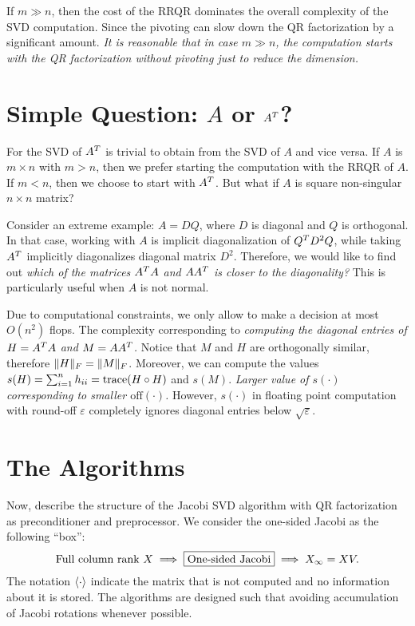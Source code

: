 \documentclass{article}
\begin{document}
\begin{remark}
  If $m \gg n$, then the cost of the RRQR dominates the overall complexity
  of the SVD computation. Since the pivoting can slow down the QR
  factorization by a significant amount. \emph{It is reasonable that in
    case $m\gg n$, the computation starts with the QR factorization without
  pivoting just to reduce the dimension.}
\end{remark}

\section{Simple Question: $A$ or $A^{T}$?}
For the SVD of $A^{T}$ is trivial to obtain from the SVD of $A$ and vice
versa. If $A$ is $m\times n$ with $m > n$, then we prefer starting the
computation with the RRQR of $A$. If $m < n$, then we choose to start with
$A^{T}$. But what if $A$ is square non-singular $n\times n$ matrix? 

Consider an extreme example: $A = DQ$, where $D$ is diagonal and $Q$ is
orthogonal. In that case, working with $A$ is implicit diagonalization of
$Q^{T} D^2Q$, while taking $A^{T}$ implicitly diagonalizes diagonal matrix
$D^2$. Therefore, we would like to find out \emph{which of the matrices
  $A^{T} A$ and $AA^{T}$ is closer to the diagonality?} This is particularly
useful when $A$ is not normal.

Due to computational constraints, we only allow to make a decision at most
$O(n^2)$ flops. The complexity corresponding to \emph{computing the
  diagonal entries of $H = A^{T} A$ and $M = AA^{T}$.} Notice that $M$ and
$H$ are orthogonally similar, therefore $\|{H}\|_F = \|{M}\|_F$. Moreover,
we can compute the values $s(H) = \sum_{i=1}^nh_{ii} = \operatorname{trace}(H\circ H)$ and
$s(M)$. \emph{Larger value of $s(\cdot)$ corresponding to smaller
  $\mathrm{off}(\cdot)$.} 
However, $s(\cdot)$ in floating point computation with round-off
$\varepsilon$ completely ignores diagonal entries below
$\sqrt{\varepsilon}$.

\section{The Algorithms}
Now, describe the structure of the Jacobi SVD algorithm with QR
factorization as preconditioner and preprocessor. We consider the one-sided
Jacobi as the following ``box'':
\begin{equation}\notag
  \text{Full column rank $X$} \implies \boxed{\text{One-sided Jacobi}}
  \implies X_{\infty} = XV.
\end{equation}
The notation $\langle\cdot\rangle$ indicate the matrix that is not computed and
no information about it is stored. The algorithms are designed such that
avoiding accumulation of Jacobi rotations whenever possible.
\end{document}
